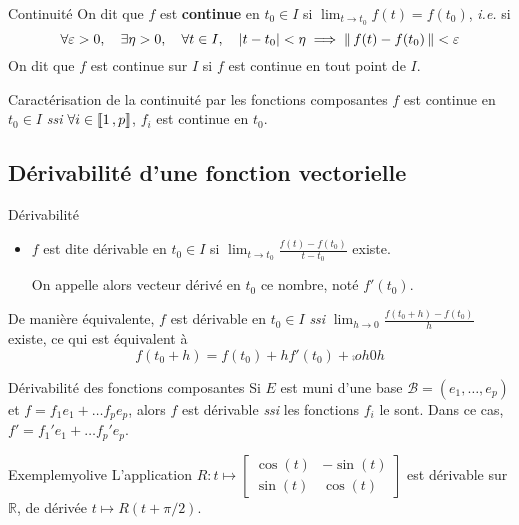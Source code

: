     \begin{defi}{Continuité}{}
        On dit que $f$ est \textbf{continue} en $t_0 \in I$ si $\lim_{t \to t_0} f(t) = f(t_0)$, \textit{i.e.} si 
        \[ \forall \varepsilon > 0, \quad \exists \eta > 0, \quad \forall t \in I, \quad \left\lvert t - t_0\right\rvert < \eta \implies \left\lVert\,f(t) - f(t_0)\,\right\rVert < \varepsilon \]
        On dit que $f$ est continue sur $I$ si $f$ est continue en tout point de $I$.
    \end{defi}

    \begin{prop}{Caractérisation de la continuité par les fonctions composantes}{}
        $f$ est continue en $t_0 \in I$ \textit{ssi} $\forall i \in \left\llbracket 1 \, , p \right\rrbracket$, $f_i$ est continue en $t_0$.
    \end{prop}

\subsection{Dérivabilité d’une fonction vectorielle}

    \begin{defi}{Dérivabilité}{}
        \begin{itemize}
            \item $f$ est dite dérivable en $t_0 \in I$ si $\lim_{t \to t_0} \frac{f(t) - f(t_0)}{t - t_0}$ existe.
            
            On appelle alors vecteur dérivé en $t_0$ ce nombre, noté $f'(t_0)$.
        \end{itemize}
    \end{defi}

    De manière équivalente, $f$ est dérivable en $t_0 \in I$ \textit{ssi} $\lim_{h \to 0} \frac{f(t_0 + h) - f(t_0)}{h}$ existe, ce qui est équivalent à 
    \[ f(t_0 + h) = f(t_0) + hf'(t_0) + \comp{o}{h}{0}{h} \]

    \begin{prop}{Dérivabilité des fonctions composantes}{}
        Si $E$ est muni d’une base $\mathcal{B} = (e_1,\ldots, e_p)$ et $f = f_1 e_1 + \ldots f_p e_p$, alors $f$ est dérivable \textit{ssi} les fonctions $f_i$ le sont. Dans ce cas, $f' = f_1' e_1  + \ldots f_p' e_p$.
    \end{prop}

    \begin{omed}{Exemple}{myolive}
        L’application $R : t \mapsto \begin{bmatrix}
            \cos(t) & -\sin(t) \\
            \sin(t) & \cos(t)
        \end{bmatrix}$ est dérivable sur $\mathbb{R}$, de dérivée $t \mapsto R(t + \pi / 2)$.
    \end{omed}

